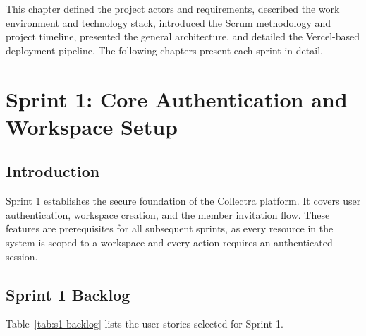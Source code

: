 \documentclass[12pt,a4paper]{report}
\begin{document}
This chapter defined the project actors and requirements, described the work
environment and technology stack, introduced the Scrum methodology and project
timeline, presented the general architecture, and detailed the Vercel-based
deployment pipeline.
The following chapters present each sprint in detail.

\clearpage
\chapter{Sprint 1: Core Authentication and Workspace Setup}
\label{chap:sprint1}

\section*{Introduction}
{}

Sprint 1 establishes the secure foundation of the Collectra platform.
It covers user authentication, workspace creation, and the member invitation flow.
These features are prerequisites for all subsequent sprints, as every resource in
the system is scoped to a workspace and every action requires an authenticated session.

\section{Sprint 1 Backlog}

Table~\ref{tab:s1-backlog} lists the user stories selected for Sprint 1.
\end{document}
